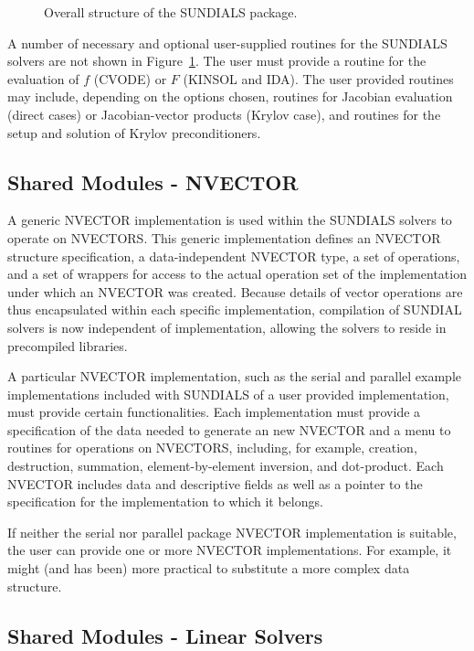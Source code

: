 \begin{figure}[tp]
\centerline{}
\caption{Overall structure of the SUNDIALS  package.}
\label{fig-sunorg}
\end{figure}

A number of necessary and optional user-supplied routines for the SUNDIALS
solvers are not shown in \mbox{Figure \ref{fig-sunorg}}. The user must
provide a routine for the evaluation of $f$ (CVODE) or $F$ (KINSOL and
IDA). The user provided routines may include, depending on the options
chosen, routines for Jacobian evaluation (direct cases) or Jacobian-vector
products (Krylov case), and routines for the setup and solution of Krylov
preconditioners.

\subsection{Shared Modules - NVECTOR}

A generic NVECTOR implementation is used within the SUNDIALS solvers to
operate on NVECTORS. This generic implementation defines an NVECTOR
structure specification, a data-independent NVECTOR type, a set of
operations, and a set of wrappers for access to the actual operation set of
the implementation under which an NVECTOR was created. Because details of
vector operations are thus encapsulated within each specific implementation,
compilation of SUNDIAL solvers is now independent of implementation,
allowing the solvers to reside in precompiled libraries.

A particular NVECTOR implementation, such as the serial and parallel example
implementations included with SUNDIALS of a user provided implementation,
must provide certain functionalities. Each implementation must provide a
specification of the data needed to generate an new NVECTOR and a menu to
routines for operations on NVECTORS, including, for example, creation,
destruction, summation, element-by-element inversion, and dot-product. Each
NVECTOR includes data and descriptive fields as well as a pointer to the
specification for the implementation to which it belongs.

If neither the serial nor parallel package NVECTOR implementation is
suitable, the user can provide one or more NVECTOR implementations.  For
example, it might (and has been) more practical to substitute a more complex
data structure.


\subsection{Shared Modules - Linear Solvers}

